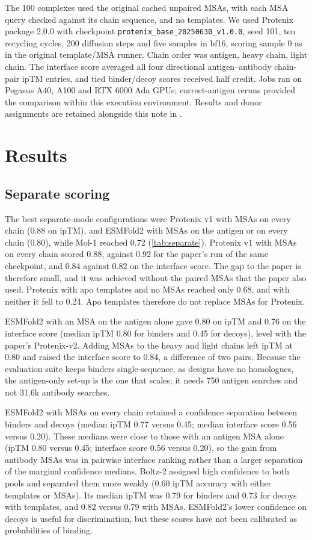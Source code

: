 \documentclass[11pt,a4paper]{article}
\begin{document}
The 100 complexes used the original cached unpaired MSAs, with each MSA query checked against its chain sequence, and no templates.
We used Protenix package 2.0.0 with checkpoint \texttt{protenix\_base\_20250630\_v1.0.0}, seed 101, ten recycling cycles, 200 diffusion steps and five samples in bf16, scoring sample 0 as in the original template/MSA runner.
Chain order was antigen, heavy chain, light chain.
The interface score averaged all four directional antigen--antibody chain-pair ipTM entries, and tied binder/decoy scores received half credit.
Jobs ran on Pegasus A40, A100 and RTX 6000 Ada GPUs; correct-antigen reruns provided the comparison within this execution environment.
Results and donor assignments are retained alongside this note in .

\section{Results}

\subsection{Separate scoring}

The best separate-mode configurations were Protenix v1 with MSAs on every chain (0.88 on ipTM), and ESMFold2 with MSAs on the antigen or on every chain (0.80), while Mol-1 reached 0.72 (\cref{tab:separate}).
Protenix v1 with MSAs on every chain scored 0.88, against 0.92 for the paper's run of the same checkpoint, and 0.84 against 0.82 on the interface score.
The gap to the paper is therefore small, and it was achieved without the paired MSAs that the paper also used.
Protenix with apo templates and no MSAs reached only 0.68, and with neither it fell to 0.24.
Apo templates therefore do not replace MSAs for Protenix.

ESMFold2 with an MSA on the antigen alone gave 0.80 on ipTM and 0.76 on the interface score (median ipTM 0.80 for binders and 0.45 for decoys), level with the paper's Protenix-v2.
Adding MSAs to the heavy and light chains left ipTM at 0.80 and raised the interface score to 0.84, a difference of two pairs.
Because the evaluation suite keeps binders single-sequence, as designs have no homologues, the antigen-only set-up is the one that scales; it needs 750 antigen searches and not 31.6k antibody searches.

ESMFold2 with MSAs on every chain retained a confidence separation between binders and decoys (median ipTM 0.77 versus 0.45; median interface score 0.56 versus 0.20).
These medians were close to those with an antigen MSA alone (ipTM 0.80 versus 0.45; interface score 0.56 versus 0.20), so the gain from antibody MSAs was in pairwise interface ranking rather than a larger separation of the marginal confidence medians.
Boltz-2 assigned high confidence to both pools and separated them more weakly (0.60 ipTM accuracy with either templates or MSAs).
Its median ipTM was 0.79 for binders and 0.73 for decoys with templates, and 0.82 versus 0.79 with MSAs.
ESMFold2's lower confidence on decoys is useful for discrimination, but these scores have not been calibrated as probabilities of binding.
\end{document}
